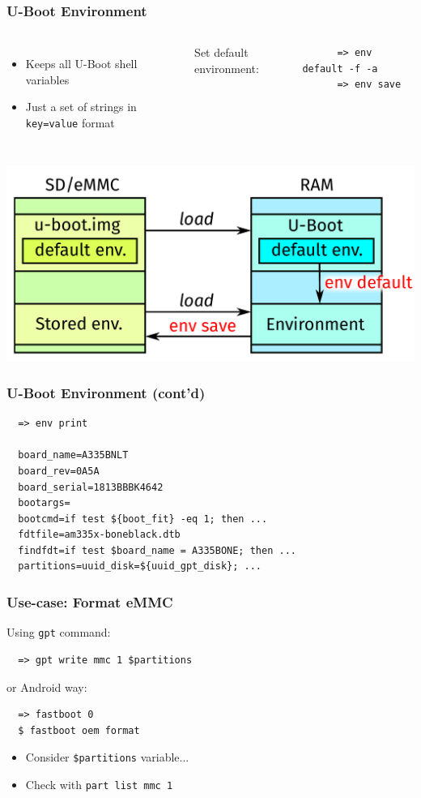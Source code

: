 \documentclass[aspectratio=169]{beamer}
\begin{document}
\begin{frame}[fragile]
  \frametitle{U-Boot Environment}
  \begin{columns}
      \begin{itemize}
      \item Keeps all U-Boot shell variables
      \item Just a set of strings in \texttt{key=value} format
      \end{itemize}
    \pause
      Set default environment:
      \begin{verbatim}
      => env default -f -a
      => env save
      \end{verbatim}
     \vspace*{-14mm} %
  \end{columns}
  \pause
  \bigskip
  \begin{center}
  \includegraphics[scale=0.33]{images/env.pdf}
  \end{center}
\end{frame}

\begin{frame}[fragile]
  \frametitle{U-Boot Environment (cont'd)}
  \begin{verbatim}
  => env print

  board_name=A335BNLT
  board_rev=0A5A
  board_serial=1813BBBK4642
  bootargs=
  bootcmd=if test ${boot_fit} -eq 1; then ...
  fdtfile=am335x-boneblack.dtb
  findfdt=if test $board_name = A335BONE; then ...
  partitions=uuid_disk=${uuid_gpt_disk}; ...
  \end{verbatim}
\end{frame}

\begin{frame}[fragile]
  \frametitle{Use-case: Format eMMC}
  Using \texttt{gpt} command:
  \begin{verbatim}
  => gpt write mmc 1 $partitions
  \end{verbatim}
  \pause
  or Android way:
  \begin{verbatim}
  => fastboot 0
  $ fastboot oem format
  \end{verbatim}
  \pause
  \begin{itemize}
  \item Consider \alert{\texttt{\$partitions}} variable...
  \item Check with \texttt{part list mmc 1}
  \end{itemize}
\end{frame}
\end{document}
